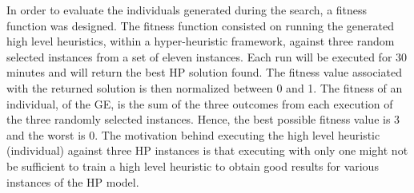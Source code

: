 \documentclass[conference]{IEEEtran}
\begin{document}
In order to evaluate the individuals generated during the search, a fitness function was designed. The fitness function consisted on running the generated high level heuristics, within a hyper-heuristic framework, against three random selected instances from a set of eleven instances. Each run will be executed for 30 minutes and will return the best HP solution found. The fitness value associated with the returned solution is then normalized between 0 and 1. The fitness of an individual, of the GE, is the sum of the three outcomes from each execution of the three randomly selected instances. Hence, the best possible fitness value is 3 and the worst is 0.
 The motivation behind executing the high level heuristic (individual) against three HP instances is that executing with only one might not be sufficient to train a high level heuristic to obtain good results for various instances of the HP model.
\end{document}
